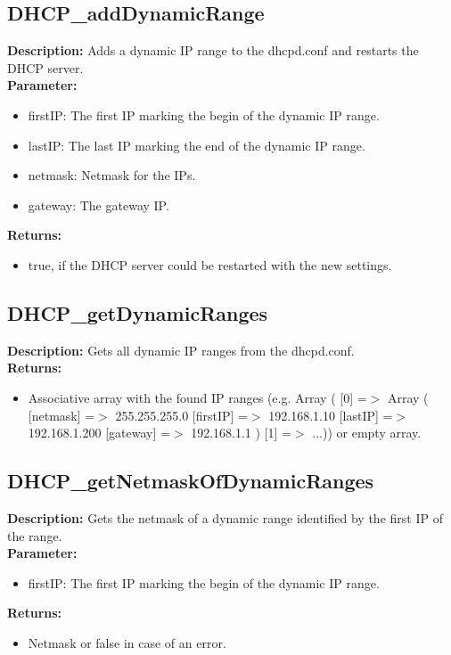 \subsection{DHCP\_addDynamicRange}
\textbf{Description:} Adds a dynamic IP range to the dhcpd.conf and restarts the DHCP server.\\
\textbf{Parameter:}
\begin{itemize}
\item firstIP: The first IP marking the begin of the dynamic IP range.
\item lastIP: The last IP marking the end of the dynamic IP range.
\item netmask: Netmask for the IPs.
\item gateway: The gateway IP.
\end{itemize}
\textbf{Returns:}
\begin{itemize}
\item true, if the DHCP server could be restarted with the new settings.
\end{itemize}

\subsection{DHCP\_getDynamicRanges}
\textbf{Description:} Gets all dynamic IP ranges from the dhcpd.conf.\\
\textbf{Returns:}
\begin{itemize}
\item Associative array with the found IP ranges (e.g. Array ( [0] =$>$ Array ( [netmask] =$>$ 255.255.255.0 [firstIP] =$>$ 192.168.1.10 [lastIP] =$>$ 192.168.1.200 [gateway] =$>$ 192.168.1.1 ) [1] =$>$ ...)) or empty array.
\end{itemize}

\subsection{DHCP\_getNetmaskOfDynamicRanges}
\textbf{Description:} Gets the netmask of a dynamic range identified by the first IP of the range.\\
\textbf{Parameter:}
\begin{itemize}
\item firstIP: The first IP marking the begin of the dynamic IP range.
\end{itemize}
\textbf{Returns:}
\begin{itemize}
\item Netmask or false in case of an error.
\end{itemize}

